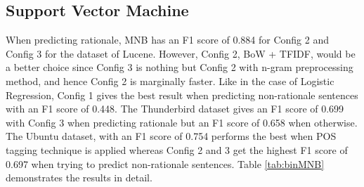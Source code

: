 \documentclass[a4paper,12pt,twoside]{report}
\begin{document}
\subsection{Support Vector Machine}
When predicting rationale, MNB has an F1 score of 0.884 for Config 2 and Config 3 for the dataset of Lucene. However, Config 2, BoW + TFIDF, would be a better choice since Config 3 is nothing but Config 2 with n-gram preprocessing method, and hence Config 2 is marginally faster. Like in the case of Logistic Regression, Config 1 gives the best result when predicting non-rationale sentences with an F1 score of 0.448. The Thunderbird dataset gives an F1 score of 0.699 with Config 3 when predicting rationale but an F1 score of 0.658 when otherwise. The Ubuntu dataset, with an F1 score of 0.754 performs the best when POS tagging technique is applied whereas Config 2 and 3 get the highest F1 score of 0.697 when trying to predict non-rationale sentences. Table \ref{tab:binMNB} demonstrates the results in detail. 
\end{document}
